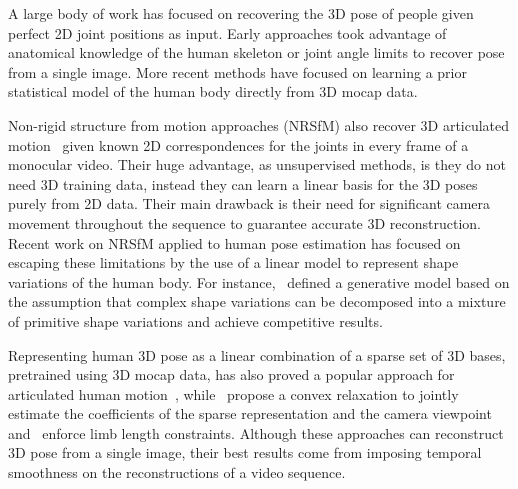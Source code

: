 \documentclass[10pt,twocolumn,letterpaper]{article}
\begin{document}
 A large body of work
has focused on recovering the 3D pose of people given perfect 2D joint
positions as input. Early approaches \cite{lee1985determination,
  taylor2000reconstruction, parameswaran2004view,
  barron2001estimating} took advantage of anatomical knowledge of the
human skeleton or joint angle limits to recover pose from a single
image. More recent methods \cite{fan2014pose,
  ramakrishna2012reconstructing,akhter2015pose} have focused on learning a prior
statistical model of the human body directly from 3D mocap
data.%

Non-rigid structure from motion approaches (NRSfM) also recover 3D
articulated
motion~\cite{bregler2000recovering,Akhter:etal:PAMI:2011,Gotardo:Martinez:PAMI:2012,Lee:etal:PAMI}
given known 2D correspondences for the joints in every frame of a
monocular video. Their huge advantage, as unsupervised methods, is
they do not need 3D training data, instead they can learn a linear
basis for the 3D poses purely from 2D data.
Their main drawback is their need for significant camera movement
throughout the sequence to guarantee accurate 3D
reconstruction.  Recent work on NRSfM applied to human pose estimation has
focused on escaping these limitations by the use of a linear
model to represent shape variations of the human body. For
instance,~\cite{cho2016complex} defined a generative
model based on the assumption that complex shape variations can be
decomposed into a mixture of primitive shape variations and achieve
competitive results.%

Representing human 3D pose as a linear combination of a sparse set of
3D bases, pretrained using 3D mocap data, has also proved a popular
approach for articulated human
motion~\cite{ramakrishna2012reconstructing,
  Wang:etal:CVPR:2014,zhou2015sparse}, while~\cite{zhou2015sparse}
propose a convex relaxation to jointly estimate the coefficients of
the sparse representation and the camera
viewpoint~\cite{ramakrishna2012reconstructing}
and~\cite{Wang:etal:CVPR:2014} enforce limb length
constraints. Although these approaches can reconstruct 3D pose from a
single image, their best results come from imposing temporal
smoothness on the reconstructions of a video sequence.
\end{document}
